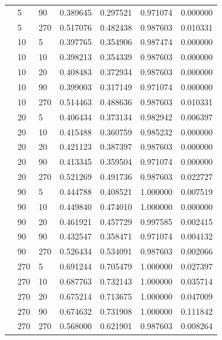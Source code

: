 \documentclass[pageno]{jpaper}
\begin{document}
\begin{longtable}{p{2cm} p{2cm} p{2cm} p{2cm} p{2cm} p{2cm} p{2cm}}
& 5 & 90 & 0.389645 & 0.297521 & 0.971074 & 0.000000 \\

& 5 & 270 & 0.517076 & 0.482438 & 0.987603 & 0.010331 \\

& 10 & 5 & 0.397765 & 0.354906 & 0.987474 & 0.000000 \\

& 10 & 10 & 0.398213 & 0.354339 & 0.987603 & 0.000000 \\

& 10 & 20 & 0.408483 & 0.372934 & 0.987603 & 0.000000 \\

& 10 & 90 & 0.399003 & 0.317149 & 0.971074 & 0.000000 \\

& 10 & 270 & 0.514463 & 0.488636 & 0.987603 & 0.010331 \\

& 20 & 5 & 0.406434 & 0.373134 & 0.982942 & 0.006397 \\

& 20 & 10 & 0.415488 & 0.360759 & 0.985232 & 0.000000 \\

& 20 & 20 & 0.421123 & 0.387397 & 0.987603 & 0.000000 \\

& 20 & 90 & 0.413345 & 0.359504 & 0.971074 & 0.000000 \\

& 20 & 270 & 0.521269 & 0.491736 & 0.987603 & 0.022727 \\

& 90 & 5 & 0.444788 & 0.408521 & 1.000000 & 0.007519 \\

& 90 & 10 & 0.449840 & 0.474010 & 1.000000 & 0.000000 \\

& 90 & 20 & 0.461921 & 0.457729 & 0.997585 & 0.002415 \\

& 90 & 90 & 0.432547 & 0.358471 & 0.971074 & 0.004132 \\

& 90 & 270 & 0.526434 & 0.534091 & 0.987603 & 0.002066 \\

& 270 & 5 & 0.691244 & 0.705479 & 1.000000 & 0.027397 \\

& 270 & 10 & 0.687763 & 0.732143 & 1.000000 & 0.035714 \\

& 270 & 20 & 0.675214 & 0.713675 & 1.000000 & 0.047009 \\

& 270 & 90 & 0.674632 & 0.731908 & 1.000000 & 0.111842 \\

& 270 & 270 & 0.568000 & 0.621901 & 0.987603 & 0.008264 \\
\hline
\end{longtable}

\newpage
{}


\end{document}

